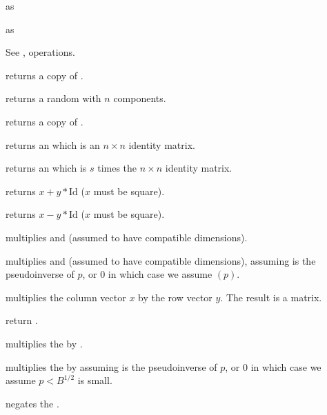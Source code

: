  as 

 as 


 See , 
operations.

 returns a copy of .


 returns a random  with $n$
components.

 returns a copy of .

 returns an  which is an $n \times n$
identity matrix.

 returns an  which is $s$ times
the $n \times n$ identity matrix.


 returns $x + y*\text{Id}$
($x$ must be square).

 returns $x - y*\text{Id}$
($x$ must be square).

 multiplies   and 
(assumed to have compatible dimensions).

 multiplies  
and  (assumed to have compatible dimensions), assuming  is the
pseudoinverse of $p$, or $0$ in which case we assume
$(p)$.

 multiplies the column vector $x$
by the row vector $y$. The result is a matrix.

return .

 multiplies the 
 by .

 multiplies the
  by  assuming  is the pseudoinverse of $p$,
or $0$ in which case we assume $p < B^{1/2}$ is small.

 negates the  .

